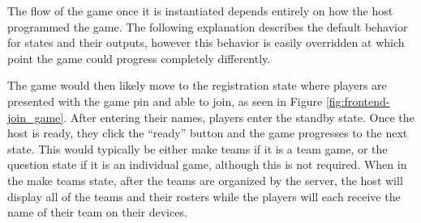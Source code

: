 \documentclass{article}
\begin{document}
            The flow of the game once it is instantiated depends entirely on how the host programmed the game. The following explanation describes the default behavior for states and their outputs, however this behavior is easily overridden at which point the game could progress completely differently.
            \smallskip
            
            The game would then likely move to the registration state where players are presented with the game pin and able to join, as seen in Figure \ref{fig:frontend-join_game}. After entering their names, players enter the standby state. Once the host is ready, they click the ``ready'' button and the game progresses to the next state. This would typically be either make teams if it is a team game, or the question state if it is an individual game, although this is not required. When in the make teams state, after the teams are organized by the server, the host will display all of the teams and their rosters while the players will each receive the name of their team on their devices. 
\end{document}
